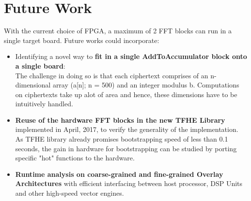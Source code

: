 \section{Future Work}
With the current choice of FPGA, a maximum of 2 FFT blocks can run in a single target board. Future works could incorporate:
\begin{itemize}
\item Identifying a novel way to \textbf{fit in a single AddToAccumulator block onto a single board}: \\The challenge in doing so is that each ciphertext comprises of an n-dimensional array (a[n]; n = 500) and an integer modulus b. Computations on ciphertexts take up alot of area and hence, these dimensions have to be intuitively handled.
\item \textbf{Reuse of the hardware FFT blocks in the new TFHE Library} implemented in April, 2017, to verify the generality of the implementation. As TFHE library already promises bootstrapping speed of less than 0.1 seconds, the gain in hardware for bootstrapping can be studied by porting specific "hot" functions to the hardware.
\item \textbf{Runtime analysis on coarse-grained and fine-grained Overlay Architectures} with efficient interfacing between host processor, DSP Units and other high-speed vector engines.
\end{itemize}